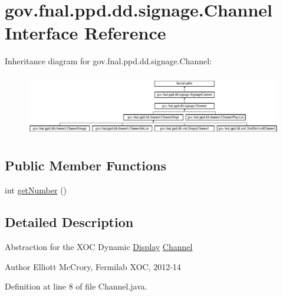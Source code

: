 \hypertarget{interfacegov_1_1fnal_1_1ppd_1_1dd_1_1signage_1_1Channel}{\section{gov.\-fnal.\-ppd.\-dd.\-signage.\-Channel Interface Reference}
\label{interfacegov_1_1fnal_1_1ppd_1_1dd_1_1signage_1_1Channel}
}
Inheritance diagram for gov.\-fnal.\-ppd.\-dd.\-signage.\-Channel\-:\begin{figure}[H]
\begin{center}
\leavevmode
\includegraphics[height=2.766798cm]{interfacegov_1_1fnal_1_1ppd_1_1dd_1_1signage_1_1Channel}
\end{center}
\end{figure}
\subsection*{Public Member Functions}
\begin{DoxyCompactItemize}
\item 
int \hyperlink{interfacegov_1_1fnal_1_1ppd_1_1dd_1_1signage_1_1Channel_ad6adca9a7ce66bbc80e2cb611c9c9587}{get\-Number} ()
\end{DoxyCompactItemize}


\subsection{Detailed Description}
Abstraction for the X\-O\-C Dynamic \hyperlink{interfacegov_1_1fnal_1_1ppd_1_1dd_1_1signage_1_1Display}{Display} \hyperlink{interfacegov_1_1fnal_1_1ppd_1_1dd_1_1signage_1_1Channel}{Channel}

\begin{DoxyAuthor}{Author}
Elliott Mc\-Crory, Fermilab X\-O\-C, 2012-\/14 
\end{DoxyAuthor}


Definition at line 8 of file Channel.\-java.



